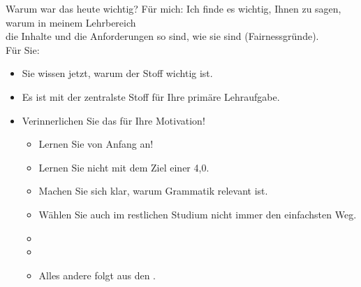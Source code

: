 \begin{frame}
  {Warum war das heute wichtig?}
  \onslide<+->
  \onslide<+->
  Für mich: Ich finde es wichtig, Ihnen zu sagen, warum in meinem Lehrbereich\\
  die Inhalte und die Anforderungen so sind, wie sie sind (\alert{Fairnessgründe}).\\
  \onslide<+->
  \Zeile
  Für Sie:\\
  \Halbzeile
  \begin{itemize}[<+->]
    \item Sie wissen jetzt, \alert{warum der Stoff wichtig ist}.
    \item Es ist mit der zentralste Stoff für Ihre primäre Lehraufgabe.
    \item \alert{Verinnerlichen Sie das für Ihre Motivation!}
      \begin{itemize}[<+->]
        \item \alert{Lernen Sie von Anfang an!}
        \item Lernen Sie nicht mit dem Ziel einer 4,0.
        \item \alert{Machen Sie sich klar, warum Grammatik relevant ist.}
        \item Wählen Sie auch im restlichen Studium nicht immer den einfachsten Weg.
          \Viertelzeile
        \item {}
          \Viertelzeile
        \item {}
        \item Alles andere folgt aus den .
      \end{itemize}
  \end{itemize}
\end{frame}


